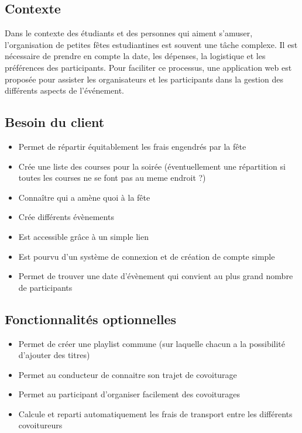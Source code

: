 \subsection{Contexte}
Dans le contexte des étudiants et des personnes qui aiment s'amuser, l'organisation de petites fêtes estudiantines est souvent une tâche complexe.
Il est nécessaire de prendre en compte la date, les dépenses, la logistique et les préférences des participants.
Pour faciliter ce processus, une application web est proposée pour assister les organisateurs et les participants dans la gestion des différents aspects de l'événement.

\subsection{Besoin du client}\label{subsec:besoin-du-client}
\begin{itemize}
    \item Permet de répartir équitablement les frais engendrés par la fête
    \item Crée une liste des courses pour la soirée (éventuellement une répartition si toutes les courses ne se font pas au meme endroit ?)
    \item Connaître qui a amène quoi à la fête
    \item Crée différents évènements
    \item Est accessible grâce à un simple lien
    \item Est pourvu d'un système de connexion et de création de compte simple
    \item Permet de trouver une date d’évènement qui convient au plus grand nombre de participants
\end{itemize}

\subsection{Fonctionnalités optionnelles}\label{subsec:fonctionnalites-optionnelles}
\begin{itemize}
    \item Permet de créer une playlist commune (sur laquelle chacun a la possibilité d'ajouter des titres)
    \item Permet au conducteur de connaitre son trajet de covoiturage
    \item Permet au participant d'organiser facilement des covoiturages
    \item Calcule et reparti automatiquement les frais de transport entre les différents covoitureurs
\end{itemize}

